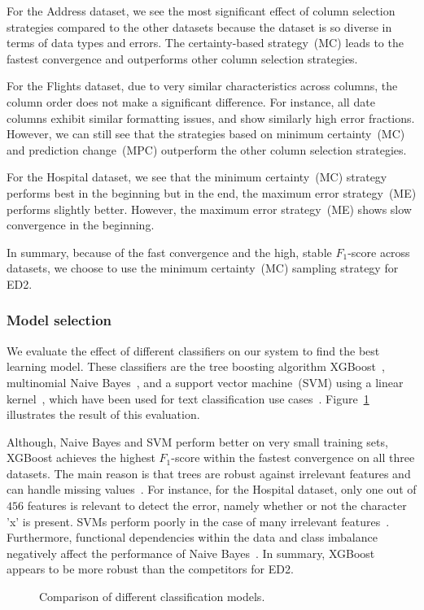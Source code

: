 For the Address dataset, we see the most significant effect of column selection strategies compared to the other datasets because the dataset is so diverse in terms of data types and errors. The certainty-based strategy~(MC) leads to the fastest convergence and outperforms other column selection strategies.

For the Flights dataset, due to very similar characteristics across columns, the column order does not make a significant difference. For instance, all date columns exhibit similar formatting issues, and show similarly high error fractions. 
However, we can still see that the strategies based on minimum certainty~(MC) and prediction change~(MPC) outperform the other column selection strategies.

For the Hospital dataset, we see that the minimum certainty~(MC) strategy performs best in the beginning but in the end, the maximum error strategy~(ME) performs slightly better. However, the maximum error strategy~(ME) shows slow convergence in the beginning.

In summary, because of the fast convergence and the high, stable $F_1$-score across datasets, we choose to use the minimum certainty~(MC) sampling strategy for ED2.

\begin{figure*}[h!]
	\centering
	
	\caption{Comparison of different column selection strategies for all datasets.} 
    \label{fig:order}
\end{figure*}





\subsubsection{Model selection}
\label{sec:model_selection}

We evaluate the effect of different classifiers on our system to find the best learning model. These classifiers are the tree boosting algorithm XGBoost~\cite{chen2016xgboost}, multinomial Naive Bayes~\cite{mccallum1998comparison}, and a support vector machine~(SVM) using a linear kernel~\cite{cortes1995support}, which have been used for text classification use cases~\cite{tong2001support, chen2016xgboost, mccallum1998comparison}. Figure~\ref{fig:model} illustrates the result of this evaluation. 

Although, Naive Bayes and SVM perform better on very small training sets, XGBoost achieves the highest $F_1$-score within the fastest convergence on all three datasets. 
The main reason is that trees are robust against irrelevant features and can handle missing values~\cite{friedman2001greedy}. For instance, for the Hospital dataset, only one out of $456$ features is relevant to detect the error, namely whether or not the character 'x' is present. SVMs perform poorly in the case of many irrelevant features~\cite{weston2001feature}. Furthermore, functional dependencies within the data and class imbalance negatively affect the performance of Naive Bayes~\cite{rennie2003tackling}.
In summary, XGBoost appears to be more robust than the competitors for ED2.


\begin{figure}[h]
	\centering
		
	\caption{Comparison of different classification models.} 
    \label{fig:model}
\end{figure}





